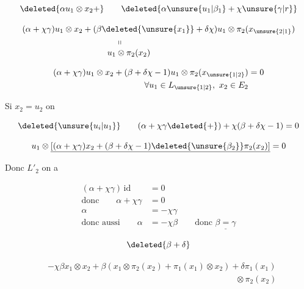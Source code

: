 \[\deleted{\alpha u_1\otimes x_2+}\qquad\deleted{\alpha\unsure{u_1|\beta_1}+\chi\unsure{\gamma|r}}\]

\[
\begin{aligned}
&(\alpha+\chi\gamma)u_1\otimes x_2+(\beta\deleted{\unsure{x_1}}+\delta\chi)u_1\otimes\pi_2(x_{\unsure{2|1}})\\
&\hspace{11em}\shortparallel\\[-2pt]
&\hspace{10em}u_1\otimes\pi_2(x_2)
\end{aligned}
\]

\[
\begin{aligned}
(\alpha+\chi\gamma)u_1\otimes x_2+(\beta+\delta\chi-1)u_1\otimes\pi_2(x_{\unsure{1|2}})&=0\\
\forall u_1\in L_{\unsure{1|2}},\ x_2\in E_2&
\end{aligned}
\]

Si $x_2=u_2$ on 

\[\deleted{\unsure{u_i|u_1}}\qquad(\alpha+\chi\gamma\deleted{+})+\chi(\beta+\delta\chi-1)=0\]

\[u_1\otimes\underline{[(\alpha+\chi\gamma)x_2+(\beta+\delta\chi-1)\deleted{\unsure{\beta_2}}\pi_2(x_2)]}=0\]

Donc  $L'_2$ on a

\[
\begin{aligned}
(\alpha+\chi\gamma)\,\mathrm{id}&=0\\
\text{donc}\qquad \alpha+\chi\gamma&=0\\
\alpha&=-\chi\gamma\\
\text{donc aussi}\qquad \alpha&=-\chi\beta\qquad\text{donc }\underline{\beta=\gamma}
\end{aligned}
\]

\[\deleted{\beta+\delta}\]

\[
\begin{aligned}
&-\chi\beta x_1\otimes x_2+\beta(x_1\otimes\pi_2(x_2)+\pi_1(x_1)\otimes x_2)+\delta\pi_1(x_1)\\
&\hspace{22em}\otimes\pi_2(x_2)
\end{aligned}
\]

